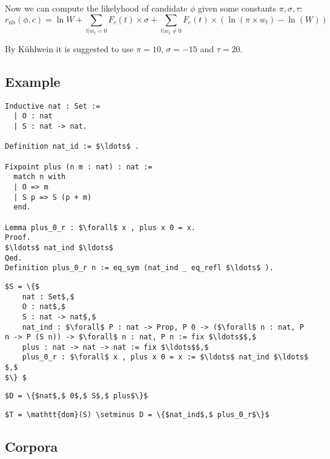 Now we can compute the likelyhood of candidate $\phi$ given some constants $\pi, \sigma, \tau$:
\[
	r_\text{nb}(\phi, c) = \ln W +
	\sum_{t | w_t = 0} F_c(t) \times \sigma +
	\sum_{t | w_t \neq 0} F_c(t) \times \left( \ln(\pi \times w_t) - \ln(W) \right)
\]

By K\"uhlwein \cite{kuhlwein2013mash} it is suggested to use $\pi = 10$, $\sigma = -15$ and $\tau = 20$.

\subsection{Example}
\begin{lstlisting}[language=Coq, mathescape]
Inductive nat : Set :=
  | O : nat
  | S : nat -> nat.

Definition nat_id := $\ldots$ .

Fixpoint plus (n m : nat) : nat :=
  match n with
  | O => m
  | S p => S (p + m)
  end.

Lemma plus_0_r : $\forall$ x , plus x 0 = x.
Proof.
$\ldots$ nat_ind $\ldots$
Qed.
Definition plus_0_r n := eq_sym (nat_ind _ eq_refl $\ldots$ ).
\end{lstlisting}

\begin{lstlisting}[language=Coq, mathescape, frame=none]
$S = \{$
	nat : Set$,$
	O : nat$,$
	S : nat -> nat$,$
	nat_ind : $\forall$ P : nat -> Prop, P 0 -> ($\forall$ n : nat, P n -> P (S n)) -> $\forall$ n : nat, P n := fix $\ldots$$,$
	plus : nat -> nat -> nat := fix $\ldots$$,$
	plus_0_r : $\forall$ x , plus x 0 = x := $\ldots$ nat_ind $\ldots$ $,$
$\} $
\end{lstlisting}

\begin{lstlisting}[language=Coq, mathescape, frame=none]
$D = \{$nat$,$ 0$,$ S$,$ plus$\}$
\end{lstlisting}

\begin{lstlisting}[language=Coq, mathescape, frame=none]
$T = \mathtt{dom}(S) \setminus D = \{$nat_ind$,$ plus_0_r$\}$
\end{lstlisting}

\subsection{Corpora}
\begin{description}
    \item[\compcert]
    \item[\formalin]
    \item[\corn]
    \item[\mathcomp]
\end{description}

